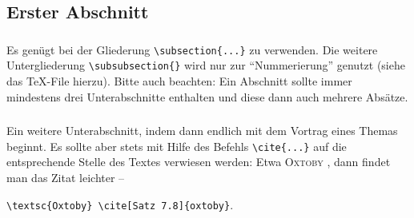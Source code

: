 \thispagestyle{empty}
\begin{abstract}
\noindent
Hier steht eine kurze Zusammenfassung des Inhalts des Vortrags oder der Hausarbeit.
Dazu dieses \TeX{}-File kopieren und umbenennen.
Weitergehende Literatur ist im  Literatur\-verzeichnis aufgeführt, wobei ich das Buch von \textsc{Voss} \cite{voss-wiss} empfehlen kann.
Für einen Einstieg empfehle ich \emph{l2kurz.pdf}, dass man auf 
%
\begin{center}
\texttt{http://mirror.ctan.org/info/lshort/german/} 
\end{center}
%
findet.
Weiteres in meinem Erläuterungen \emph{Sem-ReadMe.md}.
Ein Teil der hier angegeben Literatur und weiteres findet sich auf ILIAS \bzw in dem \og PDF.
\end{abstract}
%
\subsection{Erster Abschnitt}\label{sec:erster-abschnitt}
\subsubsection{}
Es genügt bei der Gliederung  \verb|\subsection{...}| zu verwenden.
Die weitere Untergliederung \verb|\subsubsection{}| wird nur zur \enquote{Nummerierung} genutzt (siehe das \TeX{}-File hierzu).
Bitte auch beachten: Ein Abschnitt sollte immer mindestens drei Unterabschnitte enthalten und diese dann auch mehrere Absätze. 

%
\subsubsection{} 
Ein weitere Unterabschnitt, indem dann endlich mit dem Vortrag eines Themas beginnt. 
Es sollte aber stets mit Hilfe des Befehls \verb|\cite{...}| auf die entsprechende Stelle des Textes verwiesen werden: Etwa \textsc{Oxtoby} \cite[Satz 7.8]{oxtoby}, dann findet man das Zitat leichter -- 
%
\begin{center}
\verb|\textsc{Oxtoby} \cite[Satz 7.8]{oxtoby}|.
\end{center}
%
